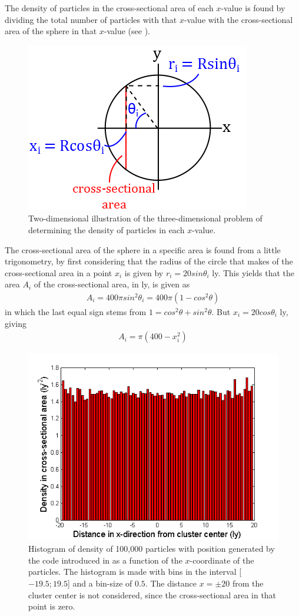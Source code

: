 The density of particles in the cross-sectional area of each $x$-value is found by dividing the total number of particles with that $x$-value with the cross-sectional area of the sphere in that $x$-value (see ).
\begin{figure}[H]
\centering
	\includegraphics[width=0.4\linewidth]{Figures/Cross_sectional_area.png}
\caption{
Two-dimensional illustration of the three-dimensional problem of determining the density of particles in each $x$-value.
}
\label{fig:Cross_sectional_area}
\end{figure}
The cross-sectional area of the sphere in a specific area is found from a little trigonometry, by first considering that the radius of the circle that makes of the cross-sectional area in a point $x_i$ is given by $r_i = 20sin\theta_i$ ly.  
This yields that the area $A_i$ of the cross-sectional area, in ly, is given as
\begin{align}
	A_i = 400\pi sin^2 \theta_i =  400\pi (1 - cos^2 \theta)
\end{align}
in which the last equal sign stems from $1 = cos^2 \theta + sin^2 \theta$.
But $x_i = 20 cos \theta_i$ ly, giving
\begin{align}
	A_i = \pi (400 - x_i^2)
\end{align}
\begin{figure}[H]
\centering
	\includegraphics[width=0.7\linewidth]{Figures/random_uniform_position_test.png}
\caption{
Histogram of density of 100,000 particles with position generated by the code introduced in  as a function of the $x$-coordinate of the particles. The histogram is made with bins in the interval [$-19.5;19.5$] and a bin-size of $0.5$. The distance $x = \pm 20$ from the cluster center is not considered, since the cross-sectional area in that point is zero.
}
\label{fig:UniformlyGeneratedPos}
\end{figure}